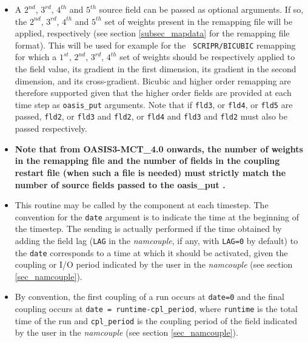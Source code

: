 \begin{itemize}

\item A $2^{nd}$, $3^{rd}$, $4^{th}$ and $5^{th}$ source field can be
  passed as optional arguments. If so, the $2^{nd}$, $3^{rd}$,
  $4^{th}$ and $5^{th}$ set of weights present in the remapping file
  will be applied, respectively (see section \ref{subsec_mapdata} for
  the remapping file format). This will be used for example for the {\tt
    SCRIPR/BICUBIC} remapping for which a $1^{st}$, $2^{nd}$,
  $3^{rd}$, $4^{th}$ set of weights should be respectively applied to
  the field value, its gradient in the first dimension, its gradient
  in the second dimension, and its cross-gradient. Bicubic and higher order
  remapping are therefore supported given that the higher order fields
  are provided at each time step as {\tt oasis\_put} arguments. Note
  that if {\tt fld3}, or {\tt fld4}, or {\tt fld5} are passed, {\tt fld2}, or {\tt fld3} and 
  {\tt fld2}, or {\tt fld4} and {\tt fld3} and {\tt fld2} must also be passed respectively.
  
\item {\bf Note that from OASIS3-MCT\_4.0 onwards, 
the number of weights in the remapping file and the number of fields in the coupling restart file 
(when such a file is needed) must strictly match the number of source fields passed to the 
oasis\_put .}


\item This routine may be called by the component at each timestep. The
  convention for the {\tt date} argument is to indicate the time at
  the beginning of the timestep. The sending is actually performed
  if the time obtained by adding the field lag ({\tt LAG} in the
  {\em namcouple}, if any, with {\tt LAG=0} by default) to the {\tt date} corresponds to a time at which it
  should be activated, given the coupling or I/O period indicated by
  the user in the {\it namcouple} (see section \ref{sec_namcouple}).

\item By convention, the first coupling
  of a run occurs at {\tt date=0} and the final coupling occurs
  at {\tt date = runtime-cpl\_period}, where {\tt runtime} is the total time of
  the run and {\tt cpl\_period} is the coupling period of the field indicated by
  the user in the {\it namcouple} (see section \ref{sec_namcouple}).


\end{itemize}
